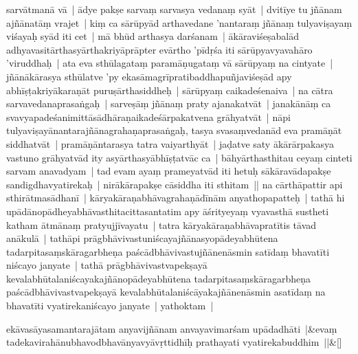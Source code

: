 \documentclass[article,12pt,a4paper]{memoir}%
\newcounter{parCount}
\begin{document}
sarvātmanā vā | ādye pakṣe sarvaṃ sarvasya vedanaṃ syāt | dvitīye tu jñānam ajñānatāṃ vrajet | kiṃ ca sārūpyād arthavedane 'nantaraṃ jñānaṃ tulyaviṣayaṃ viśayaḥ syād iti cet | \label{thakur75-125.4} mā bhūd arthasya darśanam | ākāraviśeṣabalād adhyavasitārthasyārthakriyāprāpter evārtho 'pīdṛśa iti sārūpyavyavahāro 'viruddhaḥ | ata eva sthūlagataṃ paramāṇugataṃ vā sārūpyaṃ na cintyate | jñānākārasya sthūlatve 'py ekasāmagrīpratibaddhapuñjaviśeṣād apy abhīṣṭakriyākaraṇāt puruṣārthasiddheḥ | \label{thakur75-125.7} sārūpyaṃ caikadeśenaiva | na cātra sarvavedanaprasaṅgaḥ | sarveṣāṃ jñānaṃ praty ajanakatvāt | janakānāṃ ca svavyapadeśanimittāsādhāraṇaikadeśārpakatvena grāhyatvāt | \label{thakur75-125.9} nāpi tulyaviṣayānantarajñānagrahaṇaprasaṅgaḥ, tasya svasaṃvedanād eva pramāṇāt siddhatvāt | pramāṇāntarasya tatra vaiyarthyāt | jaḍatve saty ākārārpakasya vastuno grāhyatvād ity asyārthasyābhīṣṭatvāc ca | bāhyārthasthitau ceyaṃ cinteti sarvam anavadyam | \label{thakur75-125.12} tad evam ayaṃ prameyatvād iti hetuḥ sākāravādapakṣe sandigdhavyatirekaḥ | nirākārapakṣe cāsiddha iti sthitam || \label{thakur75-125.14} na cārthāpattir api sthirātmasādhanī | kāryakāraṇabhāvagrahaṇādīnām anyathopapatteḥ | \label{thakur75-125.15} tathā hi upādānopādheyabhāvasthitacittasantatim apy āśrityeyaṃ vyavasthā sustheti katham ātmānaṃ pratyujjīvayatu | tatra kāryakāraṇabhāvapratītis tāvad anākulā | tathāpi prāgbhāvivastuniścayajñānasyopādeyabhūtena tadarpitasaṃskāragarbheṇa paścādbhāvivastujñānenāsmin satīdaṃ bhavatīti niścayo janyate | tathā prāgbhāvivastvapekṣayā kevalabhūtalaniścayakajñānopādeyabhūtena tadarpitasaṃskāragarbheṇa paścādbhāvivastvapekṣayā kevalabhūtalaniścāyakajñānenāsmin asatīdaṃ na bhavatīti vyatirekaniścayo janyate | yathoktam |
	{}
	\pend%
      
	    
	    \stanza[\smallbreak]
	  ekāvasāyasamantarajātam anyavijñānam anvayavimarśam upādadhāti |&evaṃ tadekavirahānubhavodbhavānyavyāvṛttidhīḥ prathayati vyatirekabuddhim ||\&[\smallbreak]
	  
	  
	  
\end{document}
